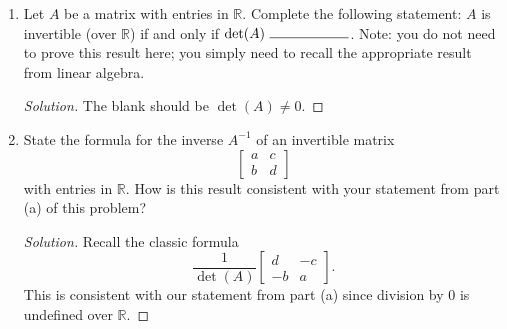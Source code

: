\documentclass[12pt]{article}
\newcommand{\R}{\mathbb{R}}
\newenvironment{exercise}[2][Exercise]{\begin{trivlist}
        \item[\hskip \labelsep {\bfseries #1}\hskip \labelsep {\bfseries #2.}]}{\end{trivlist}}
\newenvironment{solution}
        {\begin{proof}[Solution]}
                    {\end{proof}}
\begin{document}
\begin{exercise}{33}
    \begin{enumerate}[label=(\alph*)]
        \item  Let \( A \) be a matrix with entries in \( \R . \) Complete the following statement: \( A \) is invertible (over \( \R \)) if and only if \( \det(A) \ \rule{2cm}{0.15mm}  \). Note: you do not need to prove this result here; you simply need to recall the appropriate result from linear algebra.
            \begin{solution}
                The blank should be \( \det(A) \neq 0. \)
            \end{solution}
        \item State the formula for the inverse \( A^{-1} \) of an invertible matrix $$ \begin{bmatrix}
                a & c\\
                b & d
        \end{bmatrix}$$ with entries in \( \R. \) How is this result consistent with your statement from part (a) of this problem?
            \begin{solution}
                Recall the classic formula
                $$ \frac{1}{\det(A)} \begin{bmatrix}
                    d & -c\\
                    -b & a
                \end{bmatrix} .$$ This is consistent with our statement from part (a) since division by 0 is undefined over \( \R. \)
            \end{solution}
    \end{enumerate}
\end{exercise}
\end{document}
